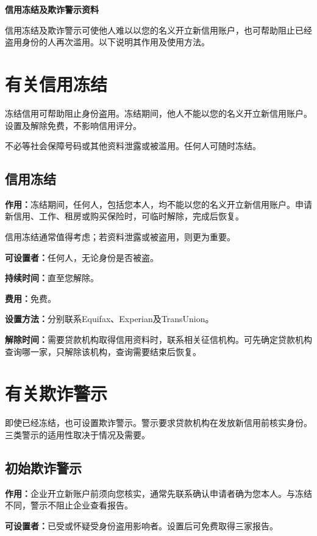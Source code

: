 \documentclass[UTF8,fontset=none,11pt,a4paper]{ctexart}
\begin{document}
{\noindent\fontsize{20}{25}\selectfont\bfseries 信用冻结及欺诈警示资料\par}
\vspace{10pt}
信用冻结及欺诈警示可使他人难以以您的名义开立新信用账户，也可帮助阻止已经盗用身份的人再次滥用。以下说明其作用及使用方法。


\section*{有关信用冻结}
冻结信用可帮助阻止身份盗用。冻结期间，他人不能以您的名义开立新信用账户。设置及解除免费，不影响信用评分。


不必等社会保障号码或其他资料泄露或被滥用。任何人可随时冻结。


\subsection*{信用冻结}
\textbf{作用：}冻结期间，任何人，包括您本人，均不能以您的名义开立新信用账户。申请新信用、工作、租房或购买保险时，可临时解除，完成后恢复。


信用冻结通常值得考虑；若资料泄露或被盗用，则更为重要。


\textbf{可设置者：}任何人，无论身份是否被盗。


\textbf{持续时间：}直至您解除。


\textbf{费用：}免费。


\textbf{设置方法：}分别联系Equifax、Experian及TransUnion。


\textbf{解除时间：}需要贷款机构取得信用资料时，联系相关征信机构。可先确定贷款机构查询哪一家，只解除该机构，查询需要结束后恢复。


\section*{有关欺诈警示}
即使已经冻结，也可设置欺诈警示。警示要求贷款机构在发放新信用前核实身份。三类警示的适用性取决于情况及需要。


\subsection*{初始欺诈警示}
\textbf{作用：}企业开立新账户前须向您核实，通常先联系确认申请者确为您本人。与冻结不同，警示不阻止企业查看报告。


\textbf{可设置者：}已受或怀疑受身份盗用影响者。设置后可免费取得三家报告。
\end{document}
